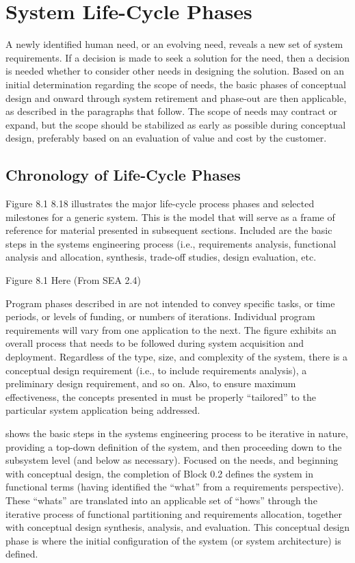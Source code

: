 \section{System Life-Cycle Phases}

A newly identified human need, or an evolving need, reveals a new set of system requirements. If a decision is made to seek a solution for the need, then a decision is needed whether to consider other needs in designing the solution. Based on an initial determination regarding the scope of needs, the basic phases of conceptual design and onward through system retirement and phase-out are then applicable, as described in the paragraphs that follow. The scope of needs may contract or expand, but the scope should be stabilized as early as possible during conceptual design, preferably based on an evaluation of value and cost by the customer.

\subsection{Chronology of Life-Cycle Phases}

Figure 8.1 8.18 illustrates the major life-cycle process phases and selected milestones for a generic system. This is the model that will serve as a frame of reference for material presented in subsequent sections. Included are the basic steps in the systems engineering process (i.e., requirements analysis, functional analysis and allocation, synthesis, trade-off studies, design evaluation, etc.

Figure 8.1 Here (From SEA 2.4)

Program phases described in are not intended to convey specific tasks, or time periods, or levels of funding, or numbers of iterations. Individual program requirements will vary from one application to the next. The figure exhibits an overall process that needs to be followed during system acquisition and deployment. Regardless of the type, size, and complexity of the system, there is a conceptual design requirement (i.e., to include requirements analysis), a preliminary design requirement, and so on. Also, to ensure maximum effectiveness, the concepts presented in must be properly ``tailored'' to the particular system application being addressed.

shows the basic steps in the systems engineering process to be iterative in nature, providing a top-down definition of the system, and then proceeding down to the subsystem level (and below as necessary). Focused on the needs, and beginning with conceptual design, the completion of Block 0.2 defines the system in functional terms (having identified the ``what'' from a requirements perspective). These ``whats'' are translated into an applicable set of ``hows'' through the iterative process of functional partitioning and requirements allocation, together with conceptual design synthesis, analysis, and evaluation. This conceptual design phase is where the initial configuration of the system (or system architecture) is defined.

